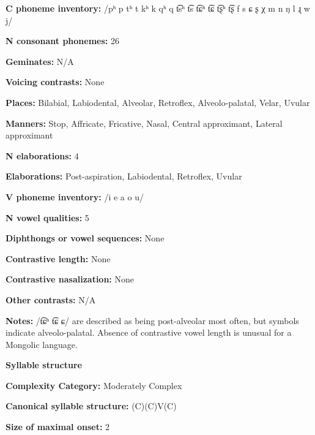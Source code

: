 \textbf{C phoneme inventory:} /pʰ p tʰ t kʰ k qʰ q t͡sʰ t͡s t͡ɕʰ t͡ɕ t͡ʂʰ t͡ʂ f s ɕ ʂ χ m n ŋ l ɻ w j/



\textbf{N consonant phonemes:} 26



\textbf{Geminates:} N/A



\textbf{Voicing contrasts:} None



\textbf{Places:} Bilabial, Labiodental, Alveolar, Retroflex, Alveolo-palatal, Velar, Uvular



\textbf{Manners:} Stop, Affricate, Fricative, Nasal, Central approximant, Lateral approximant



\textbf{N elaborations:} 4



\textbf{Elaborations:} Post-aspiration, Labiodental, Retroflex, Uvular



\textbf{V phoneme inventory:} /i e a o u/



\textbf{N vowel qualities:} 5



\textbf{Diphthongs or vowel sequences:} None



\textbf{Contrastive length:} None



\textbf{Contrastive nasalization:} None



\textbf{Other contrasts:} N/A



\textbf{Notes:} /t͡ɕʰ t͡ɕ ɕ/ are described as being post-alveolar most often, but symbols indicate alveolo-palatal. Absence of contrastive vowel length is unusual for a Mongolic language.



\textbf{Syllable structure}



\textbf{Complexity Category:} Moderately Complex



\textbf{Canonical syllable structure:} (C)(C)V(C) \citep[54-72]{Slater2003}



\textbf{Size of maximal onset:} 2



